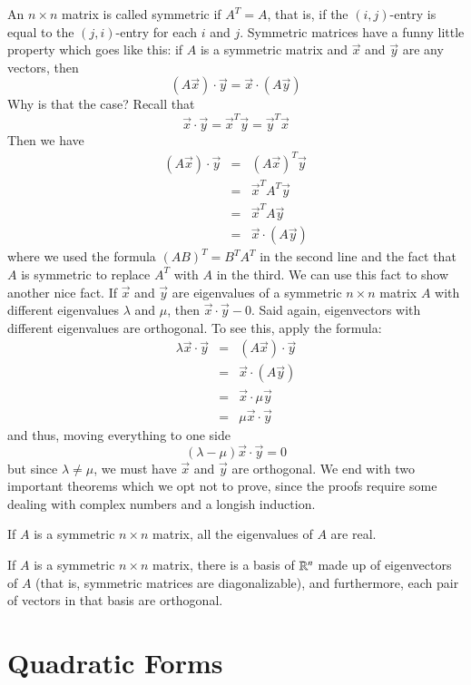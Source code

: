 \documentclass[Main.tex]{subfiles}
\begin{document}
An $n\times n$ matrix is called symmetric if $A^T=A$, that is, if the $(i,j)$-entry is equal to the $(j,i)$-entry for each $i$ and $j$.
Symmetric matrices have a funny little property which goes like this: if $A$ is a symmetric matrix and $\vec{x}$ and $\vec{y}$ are any vectors, then
\[(A\vec{x})\cdot\vec{y} = \vec{x}\cdot (A\vec{y})\]
Why is that the case?
Recall that
\[\vec{x}\cdot \vec{y} = \vec{x}^T\vec{y} = \vec{y}^T\vec{x}\]
Then we have
\begin{eqnarray*}
  (A\vec{x})\cdot\vec{y} &=& (A\vec{x})^T\vec{y} \\
  &=& \vec{x}^TA^T\vec{y}\\
  &=& \vec{x}^TA\vec{y}\\
  &=& \vec{x}\cdot (A\vec{y})
\end{eqnarray*}
where we used the formula $(AB)^T=B^TA^T$ in the second line and the fact that $A$ is symmetric to replace $A^T$ with $A$ in the third.
We can use this fact to show another nice fact.  If $\vec{x}$ and $\vec{y}$ are eigenvalues of a symmetric $n\times n$ matrix $A$ with different eigenvalues $\lambda$ and $\mu$, then $\vec{x}\cdot\vec{y}-0$.
Said again, eigenvectors with different eigenvalues are orthogonal.
To see this, apply the formula:
\begin{eqnarray*}
  \lambda\vec{x}\cdot\vec{y} &=& (A\vec{x})\cdot\vec{y}\\
  &=& \vec{x}\cdot (A\vec{y})\\
  &=& \vec{x}\cdot \mu\vec{y}\\
  &=&\mu\vec{x}\cdot\vec{y}
\end{eqnarray*}
and thus, moving everything to one side
\[(\lambda-\mu)\vec{x}\cdot\vec{y}=0\]
but since $\lambda\ne \mu$, we must have $\vec{x}$ and $\vec{y}$ are orthogonal.
We end with two important theorems which we opt not to prove, since the proofs require some dealing with complex numbers and a longish induction.
\begin{Theorem}
  If $A$ is a symmetric $n\times n$ matrix, all the eigenvalues of $A$ are real.
\end{Theorem}
\begin{Theorem}
  If $A$ is a symmetric $n\times n$ matrix, there is a basis of $\mathbb{R}^n$ made up of eigenvectors of $A$ (that is, symmetric matrices are diagonalizable), and furthermore, each pair of vectors in that basis are orthogonal.  
\end{Theorem}

\exersisest

\section{Quadratic Forms}

\exersisesu
\end{document}
